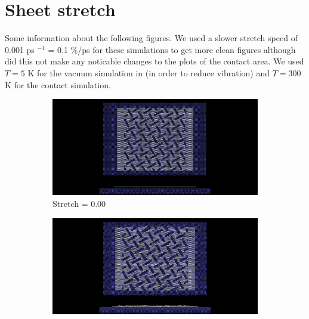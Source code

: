 \section{Sheet stretch}\label{sec:sheet_stretch}


Some information about the following figures. We used a slower stretch speed of 0.001 ps $^{-1}$ = 0.1 \%/ps for these simulations to get more clean figures although did this not make any noticable changes to the plots of the contact area. We used $T = 5$ K for the vacuum simulation in (in order to reduce vibration) and $T = 300$ K for the contact simulation.

\newpage



\begin{figure}[H]
    \centering
    \begin{subfigure}[b]{0.49\textwidth}
        \centering
        \includegraphics[width=\textwidth]{figures/baseline/contact_vs_stretch/popup/pop_stretch0000.png}
        \caption{Stretch = 0.00}
        \label{fig:}
    \end{subfigure}
    \hfill
    \begin{subfigure}[b]{0.49\textwidth}
        \centering
        \includegraphics[width=\textwidth]{figures/baseline/contact_vs_stretch/popup/pop_stretch0006.png}

\end{subfigure}
\end{figure}
